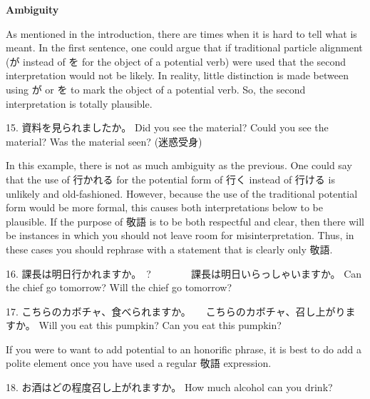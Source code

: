 \begin{center}
 \textbf{Ambiguity }
\end{center}

\par{ As mentioned in the introduction, there are times when it is hard to tell what is meant. In the first sentence, one could argue that if traditional particle alignment (が instead of を for the object of a potential verb) were used that the second interpretation would not be likely. In reality, little distinction is made between using が or を to mark the object of a potential verb. So, the second interpretation is totally plausible. }

\par{15. 資料を見られましたか。 \hfill\break
Did you see the material? \hfill\break
Could you see the material? \hfill\break
Was the material seen? (迷惑受身) }

\par{ In this example, there is not as much ambiguity as the previous. One could say that the use of 行かれる for the potential form of 行く instead of 行ける is unlikely and old-fashioned. However, because the use of the traditional potential form would be more formal, this causes both interpretations below to be plausible. If the purpose of 敬語 is to be both respectful and clear, then there will be instances in which you should not leave room for misinterpretation. Thus, in these cases you should rephrase with a statement that is clearly only 敬語. }

\par{16. 課長は明日行かれますか。　?　　　　\textrightarrow  課長は明日いらっしゃいますか。 \hfill\break
Can the chief go tomorrow? \hfill\break
Will the chief go tomorrow? }

\par{17. こちらのカボチャ、食べられますか。　\textrightarrow 　こちらのカボチャ、召し上がりますか。 \hfill\break
Will you eat this pumpkin? \hfill\break
Can you eat this pumpkin? }

\par{ If you were to want to add potential to an honorific phrase, it is best to do add a polite element once you have used a regular 敬語 expression. }

\par{18. お酒はどの程度召し上がれますか。 \hfill\break
How much alcohol can you drink? }
    